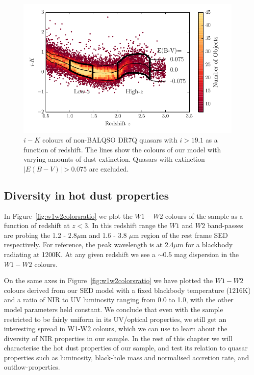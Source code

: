 \begin{figure}
  \centering
  \includegraphics[width=\columnwidth]{figures/chapter05/ik_versus_z_low_ext.pdf}
  \caption{$i-K$ colours of non-BALQSO DR7Q quasars with $i>19.1$ as a function of redshift. The lines show the colours of our model with varying amounts of dust extinction. Quasars with extinction $|E(B-V)|>0.075$ are excluded.}
  \label{fig:ikzplot}
\end{figure}

\subsection{Diversity in hot dust properties}

In Figure~\ref{fig:w1w2colorsratio} we plot the $W1 - W2$ colours of the sample as a function of redshift at $z<3$. 
In this redshift range the $W1$ and $W2$ band-passes are probing the 1.2 - 2.8$\mu$m and 1.6 - 3.8 $\mu$m region of the rest frame SED respectively. 
For reference, the peak wavelength is at 2.4$\mu$m for a blackbody radiating at 1200K. 
At any given redshift we see a $\sim 0.5$ mag dispersion in the $W1-W2$ colours. 

On the same axes in Figure~\ref{fig:w1w2colorsratio} we have plotted the $W1 - W2$ colours derived from our SED model with a fixed blackbody temperature (1216K) and a ratio of NIR to UV luminosity ranging from 0.0 to 1.0, with the other model parameters held constant. 
We conclude that even with the sample restricted to be fairly uniform in its UV/optical properties, we still get an interesting spread in W1-W2 colours, which we can use to learn about the diversity of NIR properties in our sample. 
In the rest of this chapter we will characterise the hot dust properties of our sample, and test its relation to quasar properties such as luminosity, black-hole mass and normalised accretion rate, and outflow-properties. 

